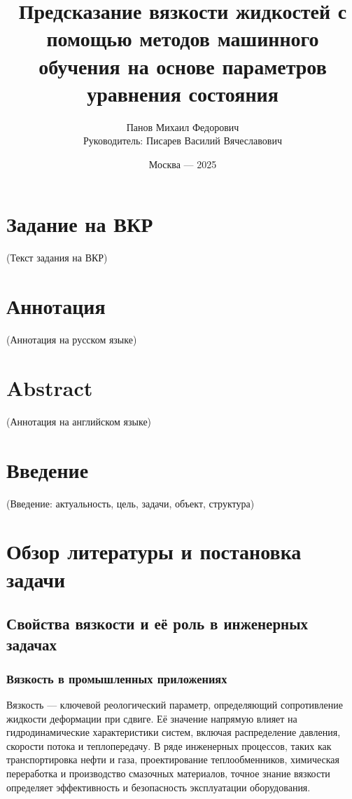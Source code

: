 \documentclass[a4paper,12pt]{article}
\title{\Huge{Предсказание вязкости жидкостей с помощью методов машинного обучения на основе параметров уравнения состояния}}
\author{Панов Михаил Федорович \\ Руководитель: Писарев Василий Вячеславович}
\date{Москва --- 2025}
\begin{document}
\maketitle
\thispagestyle{empty}
\newpage

\section*{Задание на ВКР}
(Текст задания на ВКР)

\section*{Аннотация}
(Аннотация на русском языке)

\section*{Abstract}
(Аннотация на английском языке)
\newpage

\tableofcontents
\newpage

\section*{Введение}
(Введение: актуальность, цель, задачи, объект, структура)

\section{Обзор литературы и постановка задачи}
  \subsection{Свойства вязкости и её роль в инженерных задачах}

    \subsubsection{Вязкость в промышленных приложениях}

Вязкость — ключевой реологический параметр, определяющий сопротивление жидкости деформации при сдвиге. Её значение напрямую влияет на гидродинамические характеристики систем, включая распределение давления, скорости потока и теплопередачу. В ряде инженерных процессов, таких как транспортировка нефти и газа, проектирование теплообменников, химическая переработка и производство смазочных материалов, точное знание вязкости определяет эффективность и безопасность эксплуатации оборудования. 
\end{document}
